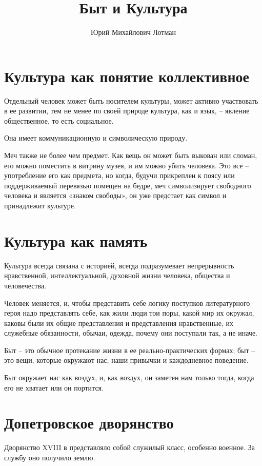 \documentclass[12pt,a4paper]{article}
\author{Юрий Михайлович Лотман}
\title{Быт и Культура}
\begin{document}
\maketitle %

\tableofcontents %
\newpage

\section{Культура как понятие коллективное}

Отдельный человек может быть носителем культуры, может
активно участвовать в ее развитии, тем не менее по своей
природе культура, как и язык, – явление общественное, то
есть социальное.

Она имеет коммуникационную и символическую природу.

Меч также не более чем предмет. Как вещь он может
быть выкован или сломан, его можно поместить в витрину
музея, и им можно убить человека. Это все – употребление
его как предмета, но когда, будучи прикреплен к поясу или
поддерживаемый перевязью помещен на бедре, меч
символизирует свободного человека и является «знаком
свободы», он уже предстает как символ и принадлежит
культуре.

\section{Культура как память}
Культура всегда связана с историей, всегда подразумевает непрерывность
нравственной, интеллектуальной, духовной жизни человека,
общества и человечества.
 
Человек меняется, и, чтобы представить себе логику
поступков литературного героя надо представлять себе, как жили люди тои поры, какой мир их окружал, каковы были их общие
представления и представления нравственные, их
служебные обязанности, обычаи, одежда, почему они поступали так, а не иначе.
 
Быт – это обычное протекание жизни в ее
реально-практических формах; быт – это вещи, которые
окружают нас, наши привычки и каждодневное поведение.

Быт окружает нас как воздух, и, как воздух, он заметен нам только тогда, когда его не хватает или он портится.
\section{Допетровское дворянство}
Дворянство XVIII в представляло собой служилый класс, особенно военное.
За службу оно  получило  землю.
  
\end{document}
